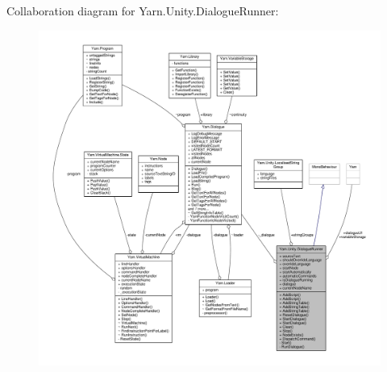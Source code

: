 Collaboration diagram for Yarn.\-Unity.\-Dialogue\-Runner\-:
\nopagebreak
\begin{figure}[H]
\begin{center}
\leavevmode
\includegraphics[width=350pt]{a00690}
\end{center}
\end{figure}
